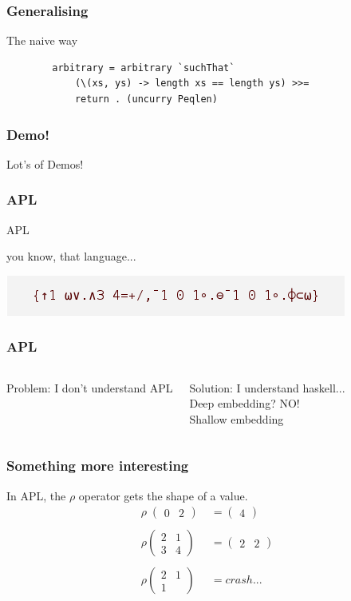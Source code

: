 \documentclass{beamer}
\begin{document}
\begin{frame}[fragile]
    \frametitle{Generalising}
    \centerline{The naive way}
    \begin{verbatim}
        arbitrary = arbitrary `suchThat`
            (\(xs, ys) -> length xs == length ys) >>=
            return . (uncurry Peqlen) 
        \end{verbatim}   
\end{frame}

\begin{frame}
    \frametitle{Demo!}
        \Huge{\centerline{Lot's of Demos!}}
\end{frame}

\begin{frame}[fragile]
    \frametitle{APL}
        \Huge{\centerline{APL}}
        \pause
        \small{\centerline{you know, that language...}}
        \centerline{}
        \centerline{\includegraphics[scale=0.5]{game_of_life.png}}
\end{frame}

\begin{frame}
    \frametitle{APL}
    \begin{columns}
            Problem: I don't understand APL\\

        \pause

            Solution: I understand haskell...\\
            Deep embedding? NO!\\
            Shallow embedding
    \end{columns}
\end{frame}

\begin{frame}
    \frametitle{Something more interesting}
        In APL, the $\rho$ operator gets the shape of a value.\\
        \begin{align*}
            \rho\;\begin{pmatrix} 0 & 2 \end{pmatrix}\; &= \begin{pmatrix}4\end{pmatrix}\\\\
            \rho \begin{pmatrix} 2 & 1 \\ 3 & 4 \end{pmatrix} &= \begin{pmatrix} 2 & 2\end{pmatrix}\\\\
            \rho \begin{pmatrix} 2 & 1 \\ 1 \end{pmatrix} &= crash...
        \end{align*}
\end{frame}
\end{document}
